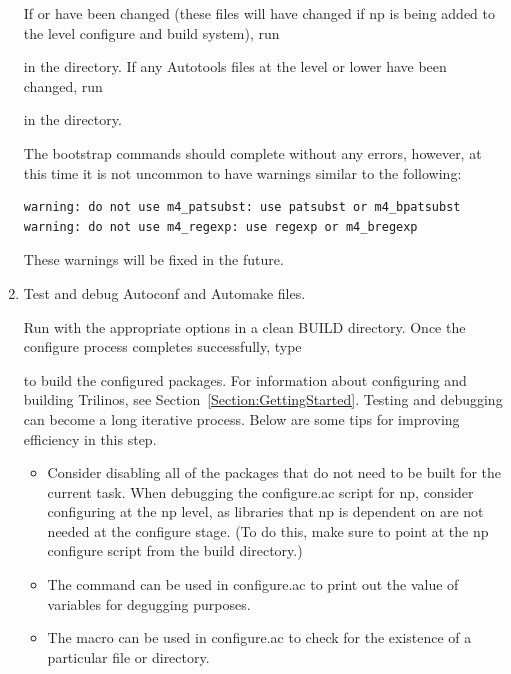 \documentclass[12pt,strict]{TrilinosDevGuide}
\begin{document}
\begin{enumerate}
If  or 
 have been changed (these files 
will have changed if np is being added to the  level 
configure and build system), run 


in the  directory.  If any Autotools files at the 
 level or lower have been changed, run 


in the  directory.

The bootstrap commands should complete without any errors, however, at this
time it is not uncommon to have warnings similar to the following:
\begin{verbatim}
warning: do not use m4_patsubst: use patsubst or m4_bpatsubst
warning: do not use m4_regexp: use regexp or m4_bregexp
\end{verbatim}
These warnings will be fixed in the future.

\item Test and debug Autoconf and Automake files.

Run  with the appropriate options in a clean BUILD 
directory.  Once the configure process completes successfully, type 


to build the configured packages.  For information about configuring and 
building Trilinos, see Section~\ref{Section:GettingStarted}.  Testing and 
debugging can become a long iterative process.  Below are some tips for 
improving efficiency in this step.  

\begin{itemize}

\item Consider disabling all of the packages that do not need to be built for 
the current task.  When debugging the configure.ac script for np, consider 
configuring at the np level, as libraries that np is dependent on are not 
needed at the configure stage.  (To do this, make sure to point at the np 
configure script from the build directory.)

\item The  command can be used in configure.ac to 
print out the value of variables for degugging purposes.

\item The  macro can be used in configure.ac to 
check for the existence of a particular file or directory.


\end{itemize}
\end{enumerate}
\end{document}
